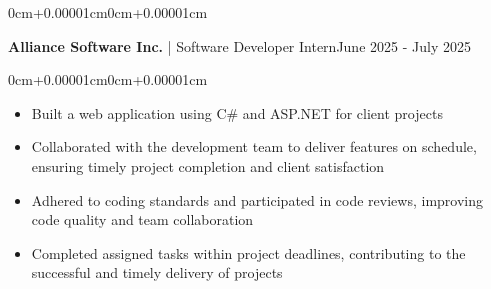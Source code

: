 \documentclass[10pt, letterpaper]{article}
\newenvironment{highlights}{\begin{itemize}[topsep=0.10cm,parsep=0.10cm,partopsep=0pt,itemsep=0pt,leftmargin=0cm+10pt]}{\end{itemize}}
\newenvironment{onecolentry}{\begin{adjustwidth}{0cm+0.00001cm}{0cm+0.00001cm}}{\end{adjustwidth}}
\newenvironment{twocolentry}[2][]{\onecolentry\def\secondColumn{#2}\setcolumnwidth{\fill,5cm}\begin{paracol}{2}}{\switchcolumn \raggedleft \secondColumn\end{paracol}\endonecolentry}
\begin{document}
    \begin{twocolentry}{June 2025 - July 2025}
    \textbf{Alliance Software Inc.} | Software Developer Intern\end{twocolentry}
    \vspace{0.10cm}
    \begin{onecolentry}
        
    \begin{highlights}
                \item Built a web application using C\# and ASP.NET for client projects
            \item Collaborated with the development team to deliver features on schedule, ensuring timely project completion and client satisfaction
            \item Adhered to coding standards and participated in code reviews, improving code quality and team collaboration
            \item Completed assigned tasks within project deadlines, contributing to the successful and timely delivery of projects
        \end{highlights}
    \end{onecolentry}
    \vspace{0.15cm}
\end{document}
